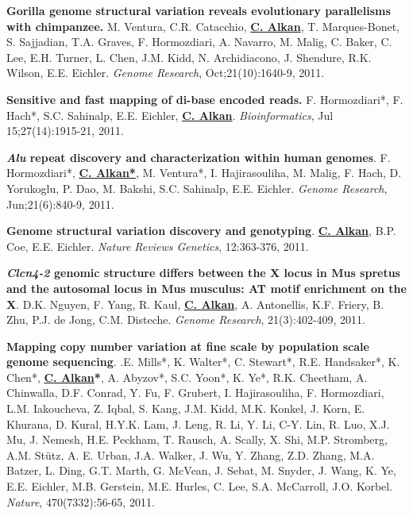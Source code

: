 \vspace{-.2cm}
{\bf Gorilla genome structural variation reveals evolutionary parallelisms with chimpanzee.}
M. Ventura, C.R. Catacchio, {\bf {\underline {C. Alkan}}}, T. Marques-Bonet, S. Sajjadian, T.A. Graves, F. Hormozdiari, A. Navarro, 
M. Malig, C. Baker, C. Lee, E.H. Turner, L. Chen, J.M. Kidd, N. Archidiacono, J. Shendure, R.K. Wilson, E.E. Eichler.
{\em Genome Research}, Oct;21(10):1640-9, 2011.


\vspace{-.2cm}
{\bf Sensitive and fast mapping of di-base encoded reads.}
F. Hormozdiari*, F. Hach*, S.C. Sahinalp, E.E. Eichler, {\bf {\underline {C. Alkan}}}.
{\em Bioinformatics}, Jul 15;27(14):1915-21, 2011.



\vspace{-.2cm}
{\bf \textit {Alu} repeat discovery and characterization within human genomes}.
F. Hormozdiari*, {\bf {\underline {C. Alkan*}}}, M. Ventura*, I. Hajirasouliha, M. Malig, 
F. Hach, D. Yorukoglu, P. Dao, M. Bakshi, S.C. Sahinalp, E.E. Eichler.
{\em Genome Research}, Jun;21(6):840-9, 2011.

\vspace{-.2cm}
{\bf Genome structural variation discovery and genotyping}. 
{\bf {\underline {C. Alkan}}}, B.P. Coe, E.E. Eichler.
{\em Nature Reviews Genetics}, 12:363-376, 2011.

\vspace{-.2cm}
{\bf {\em Clcn4-2} genomic structure differs between the X locus in Mus spretus and the autosomal 
locus in Mus musculus: AT motif enrichment on the X}.  
D.K. Nguyen, F. Yang, R. Kaul, {\bf {\underline {C. Alkan}}}, A. Antonellis, K.F. Friery, 
B. Zhu, P.J. de Jong, C.M. Disteche. 
{\em Genome Research}, 21(3):402-409, 2011.


\vspace{-.2cm}
{\bf Mapping copy number variation at fine scale by population scale genome sequencing}.
.E. Mills*, K. Walter*, C. Stewart*, R.E. Handsaker*, K. Chen*, 
{\bf {\underline {C. Alkan}*}}, A. Abyzov*, S.C. Yoon*, K. Ye*, R.K. Cheetham, 
A. Chinwalla, D.F. Conrad, Y. Fu, F. Grubert, I. Hajirasouliha, 
F. Hormozdiari, L.M. Iakoucheva, Z. Iqbal, S. Kang, J.M. Kidd, 
M.K. Konkel, J. Korn, E. Khurana, D. Kural, H.Y.K. Lam, J. Leng, 
R. Li, Y. Li, C-Y. Lin, R. Luo, X.J. Mu, J. Nemesh,
H.E. Peckham, T. Rausch, A. Scally, X. Shi, M.P. Stromberg, 
A.M. St\"{u}tz, A. E. Urban, J.A. Walker, J. Wu, Y. Zhang, 
Z.D. Zhang, M.A. Batzer, L. Ding, G.T. Marth, G. McVean, 
J. Sebat, M. Snyder, J. Wang, K. Ye, E.E. Eichler, 
M.B. Gerstein, M.E. Hurles, C. Lee, S.A. McCarroll,  J.O. Korbel.
{\em Nature}, 470(7332):56-65, 2011.


